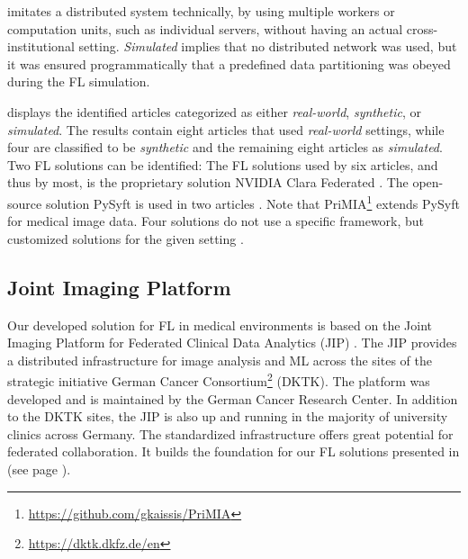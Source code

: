 imitates a distributed system technically, by using multiple workers or computation units, such as individual servers, without having an actual cross-institutional setting.
\textit{Simulated} implies that no distributed network was used, but it was ensured programmatically that a predefined data partitioning was obeyed during the FL simulation.

 displays the identified articles categorized as either \textit{real-world}, \textit{synthetic}, or \textit{simulated}. The results contain eight articles that used \textit{real-world} settings, while four are classified to be \textit{synthetic} and the remaining eight articles as \textit{simulated}.
Two FL solutions can be identified: The FL solutions used by six articles, and thus by most, is the proprietary solution NVIDIA Clara Federated \citep{Wang2020AutomatedLearning, Roth2020FederatedImplementation, Sarma2021FederatedSharing, Yang2021FederatedJapan, Li2019Privacy-preservingSegmentation, Flores2021FederatedPatients}. The open-source solution PySyft is used in two articles \citep{Kaissis2021End-to-endImaging, Lee2021FederatedEnvironment}. Note that PriMIA\footnote{\url{https://github.com/gkaissis/PriMIA}} extends PySyft for medical image data.   Four solutions do not use a specific framework, but customized solutions for the given setting \citep{Xu2020ADiagnosis, Remedios2020DistributedSegmentation, Remedios2019DistributedInjury, Dou2021FederatedStudy}.



\subsection{Joint Imaging Platform}
\label{subsec:JIP}

Our developed solution for FL in medical environments is based on the Joint Imaging Platform for Federated Clinical Data Analytics (JIP) \citep{Scherer2020JointAnalytics}.
The JIP provides a distributed infrastructure for image analysis and ML across the sites of the strategic initiative German Cancer Consortium\footnote{\url{https://dktk.dkfz.de/en}} (DKTK). The platform was developed and is maintained by the German Cancer Research Center. In addition to the DKTK sites, the JIP is also up and running in the majority of university clinics across Germany. The standardized infrastructure offers great potential for federated collaboration. It builds the foundation for our FL solutions presented in  (see page \pageref{sec:Methods}).

